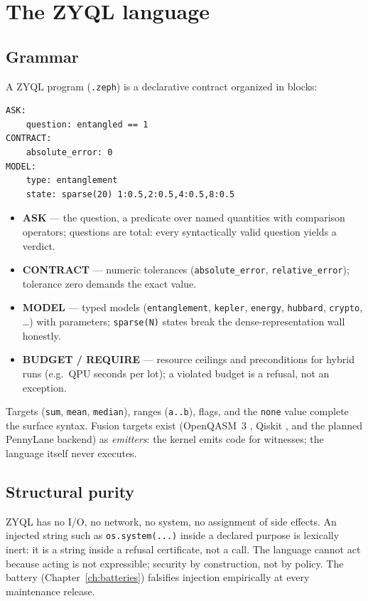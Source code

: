 \documentclass[11pt,a4paper]{report}
\begin{document}
\chapter{The ZYQL language}
\label{ch:language}

\section{Grammar}
A ZYQL program (\texttt{.zeph}) is a declarative contract organized in
blocks:
\begin{verbatim}
ASK:
    question: entangled == 1
CONTRACT:
    absolute_error: 0
MODEL:
    type: entanglement
    state: sparse(20) 1:0.5,2:0.5,4:0.5,8:0.5
\end{verbatim}
\begin{itemize}
  \item \textbf{ASK} --- the question, a predicate over named quantities
        with comparison operators; questions are total: every syntactically
        valid question yields a verdict.
  \item \textbf{CONTRACT} --- numeric tolerances (\texttt{absolute\_error},
        \texttt{relative\_error}); tolerance zero demands the exact value.
  \item \textbf{MODEL} --- typed models (\texttt{entanglement},
        \texttt{kepler}, \texttt{energy}, \texttt{hubbard},
        \texttt{crypto}, \dots) with parameters; \texttt{sparse(N)} states
        break the dense-representation wall honestly.
  \item \textbf{BUDGET / REQUIRE} --- resource ceilings and preconditions
        for hybrid runs (e.g.\ QPU seconds per lot); a violated budget is a
        refusal, not an exception.
\end{itemize}
Targets (\texttt{sum}, \texttt{mean}, \texttt{median}), ranges
(\texttt{a..b}), flags, and the \texttt{none} value complete the surface
syntax. Fusion targets exist (OpenQASM~3 \citep{openqasm3}, Qiskit
\citep{qiskit}, and the planned PennyLane backend) as \emph{emitters}: the
kernel emits code for witnesses; the language itself never executes.

\section{Structural purity}
ZYQL has no I/O, no network, no system, no assignment of side effects. An
injected string such as \texttt{os.system(...)} inside a declared purpose
is lexically inert: it is a string inside a refusal certificate, not a
call. The language cannot act because acting is not expressible; security
by construction, not by policy. The battery
(Chapter~\ref{ch:batteries}) falsifies injection empirically at every
maintenance release.
\end{document}
